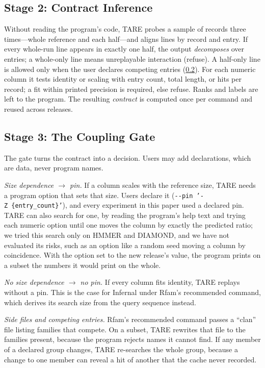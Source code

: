 \documentclass[letterpaper,twocolumn,10pt]{article}
\theoremstyle{definition}
\newcommand{\sys}{TARE\xspace}
\newcommand{\sys}{PARE\xspace}
\begin{document}
\subsection{Stage 2: Contract Inference}
\label{sec:contract}

Without reading the program's code, \sys probes a sample of records three times---whole reference and each half---and
aligns lines by record and entry. If every whole\nobreakdash-run line appears in exactly one half, the output \textit{decomposes}
over entries; a whole\nobreakdash-only line means unreplayable interaction (refuse). A half\nobreakdash-only line is allowed only when the
user declares competing entries (\cref{sec:gate}). For each numeric column it tests identity or scaling with entry
count, total length, or hits per record; a fit within printed precision is required, else refuse. Ranks and labels are
left to the program. The resulting \textit{contract} is computed once per command and reused across releases.

\subsection{Stage 3: The Coupling Gate}
\label{sec:gate}

The gate turns the contract into a decision. Users may add declarations, which are data, never program names.

\textit{Size dependence $\rightarrow$ pin.} If a column scales with the reference size, \sys needs a program option that
sets that size. Users declare it (\texttt{-{}-pin~'-Z~\{entry\_count\}'}), and every experiment in this paper used a
declared pin. \sys can also search for one, by reading the program's help text and trying each numeric option until one
moves the column by exactly the predicted ratio; we tried this search only on HMMER and DIAMOND, and we have not
evaluated its risks, such as an option like a random seed moving a column by coincidence. With the option set to the
new release's value, the program prints on a subset the numbers it would print on the whole.

\textit{No size dependence $\rightarrow$ no pin.} If every column fits identity, \sys replays without a pin. This is the
case for Infernal under Rfam's recommended command, which derives its search size from the query sequence instead.

\textit{Side files and competing entries.} Rfam's recommended command passes a ``clan'' file listing families that
compete. On a subset, \sys rewrites that file to the families present, because the program rejects names it cannot
find. If any member of a declared group changes, \sys re\nobreakdash-searches the whole group, because a change to one member
can reveal a hit of another that the cache never recorded.
\end{document}
